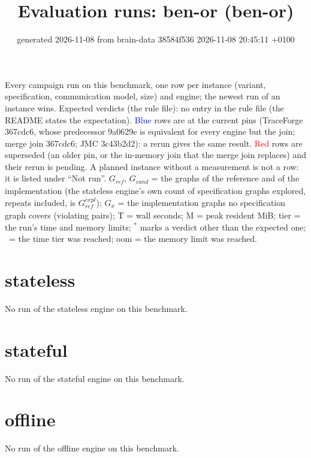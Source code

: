 \documentclass[10pt]{article}
\title{Evaluation runs: \textsf{ben-or} (ben-or)}
\author{}
\date{generated 2026-11-08 from brain-data 38584f536 2026-11-08 20:45:11 +0100}
\begin{document}
\maketitle\small
\noindent Every campaign run on this benchmark, one row per instance (variant, specification, communication model, size) and engine; the newest run of an instance wins. Expected verdicts (the rule file): no entry in the rule file (the README states the expectation). \textcolor{blue}{Blue} rows are at the current pins (TraceForge 367cdc6, whose predecessor 9a0629e is equivalent for every engine but the join; merge join 367cdc6; JMC 3c43b2d2): a rerun gives the same result. \textcolor{red}{Red} rows are superseded (an older pin, or the in-memory join that the merge join replaces) and their rerun is pending. A planned instance without a measurement is not a row: it is listed under ``Not run''. $G_{\mathit{ref}}$, $G_{\mathit{cand}}$ = the graphs of the reference and of the implementation (the stateless engine's own count of specification graphs explored, repeats included, is $G_{\mathit{ref}}^{\mathit{expl}}$); $G_x$ = the implementation graphs no specification graph covers (violating pairs); T = wall seconds; M = peak resident MiB; tier = the run's time and memory limits; $^{\ast}$ marks a verdict other than the expected one; \faClock\ = the time tier was reached; oom = the memory limit was reached.

\section*{stateless}\noindent No run of the stateless engine on this benchmark.
\section*{stateful}\noindent No run of the stateful engine on this benchmark.
\section*{offline}\noindent No run of the offline engine on this benchmark.
\end{document}
